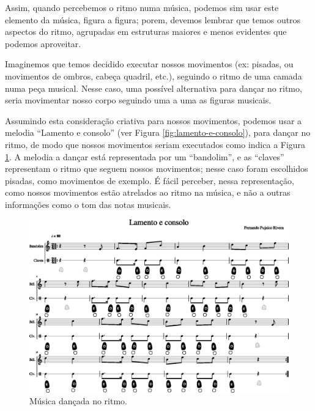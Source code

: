Assim, quando percebemos o ritmo numa música, 
podemos sim usar este elemento da música, figura a figura; 
porem, devemos lembrar que temos outros aspectos do ritmo,
agrupadas em estruturas maiores e menos evidentes que podemos aproveitar.


\begin{example}
\label{ex:dancaritmo1}
Imaginemos que temos decidido executar nossos movimentos (ex: pisadas, ou movimentos de ombros, cabeça quadril, etc.),
seguindo o ritmo de uma camada numa peça musical.
Nesse caso, uma possível alternativa para dançar no ritmo, 
seria movimentar nosso corpo seguindo uma a uma as figuras musicais.

Assumindo esta  consideração criativa para nossos movimentos, 
podemos usar a melodia ``Lamento e consolo'' (ver Figura \ref{fig:lamento-e-consolo}),
para dançar no ritmo, 
de modo que nossos movimentos seriam executados como indica a Figura \ref{fig:lamentoconsoloritmo1}.
A melodia a dançar está representada por um ``bandolim'',
e as ``claves'' representam o ritmo que seguem nossos movimentos;
nesse caso foram escolhidos pisadas, como movimentos de exemplo.
É fácil perceber, nessa representação, 
como nossos movimentos estão atrelados ao ritmo na música,
e não a outras informações como o tom das notas musicais.
\end{example}
\begin{figure}
    \centering
    \includegraphics[width=\textwidth]{chapters/cap-musicalidade-tecnica/lamento-e-consolo-clave-ritmo-1.eps}
    \caption{Música dançada no ritmo.}
    \label{fig:lamentoconsoloritmo1}
\end{figure}


